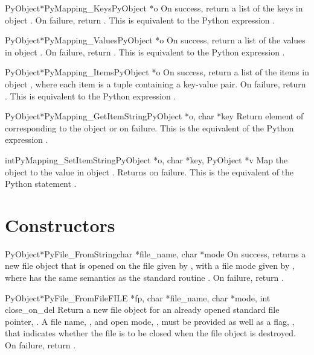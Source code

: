 \documentclass{manual}
\begin{document}
\begin{cfuncdesc}{PyObject*}{PyMapping_Keys}{PyObject *o}
On success, return a list of the keys in object .  On
failure, return \NULL{}. This is equivalent to the Python
expression .
\end{cfuncdesc}


\begin{cfuncdesc}{PyObject*}{PyMapping_Values}{PyObject *o}
On success, return a list of the values in object .  On
failure, return \NULL{}. This is equivalent to the Python
expression .
\end{cfuncdesc}


\begin{cfuncdesc}{PyObject*}{PyMapping_Items}{PyObject *o}
On success, return a list of the items in object , where
each item is a tuple containing a key-value pair.  On
failure, return \NULL{}. This is equivalent to the Python
expression .
\end{cfuncdesc}


\begin{cfuncdesc}{PyObject*}{PyMapping_GetItemString}{PyObject *o, char *key}
Return element of  corresponding to the object  or
\NULL{} on failure. This is the equivalent of the Python expression
.
\end{cfuncdesc}

\begin{cfuncdesc}{int}{PyMapping_SetItemString}{PyObject *o, char *key, PyObject *v}
Map the object  to the value  in object .
Returns  on failure.  This is the equivalent of the Python
statement .
\end{cfuncdesc}


\section{Constructors}

\begin{cfuncdesc}{PyObject*}{PyFile_FromString}{char *file_name, char *mode}
On success, returns a new file object that is opened on the
file given by , with a file mode given by ,
where  has the same semantics as the standard \C{} routine
.  On failure, return .
\end{cfuncdesc}

\begin{cfuncdesc}{PyObject*}{PyFile_FromFile}{FILE *fp, char *file_name, char *mode, int close_on_del}
Return a new file object for an already opened standard \C{} file
pointer, .  A file name, , and open mode,
, must be provided as well as a flag, ,
that indicates whether the file is to be closed when the file object
is destroyed.  On failure, return .
\end{cfuncdesc}
\end{document}
